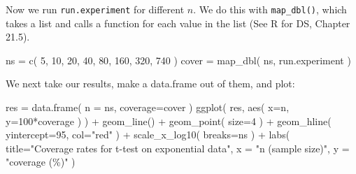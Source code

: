 \documentclass[
]{book}
\newenvironment{Shaded}{\begin{snugshade}}{\end{snugshade}}
\newcommand{\AttributeTok}[1]{\textcolor[rgb]{0.77,0.63,0.00}{#1}}
\newcommand{\ControlFlowTok}[1]{\textcolor[rgb]{0.13,0.29,0.53}{\textbf{#1}}}
\newcommand{\DecValTok}[1]{\textcolor[rgb]{0.00,0.00,0.81}{#1}}
\newcommand{\FunctionTok}[1]{\textcolor[rgb]{0.00,0.00,0.00}{#1}}
\newcommand{\NormalTok}[1]{#1}
\newcommand{\OtherTok}[1]{\textcolor[rgb]{0.56,0.35,0.01}{#1}}
\newcommand{\SpecialCharTok}[1]{\textcolor[rgb]{0.00,0.00,0.00}{#1}}
\newcommand{\StringTok}[1]{\textcolor[rgb]{0.31,0.60,0.02}{#1}}
\begin{document}
\begin{Shaded}
\end{Shaded}

Now we run \texttt{run.experiment} for different \(n\). We do this with \texttt{map\_dbl()},
which takes a list and calls a function for each value in the list (See R for
DS, Chapter 21.5).

\begin{Shaded}
\begin{Highlighting}[]
\NormalTok{ns }\OtherTok{=} \FunctionTok{c}\NormalTok{( }\DecValTok{5}\NormalTok{, }\DecValTok{10}\NormalTok{, }\DecValTok{20}\NormalTok{, }\DecValTok{40}\NormalTok{, }\DecValTok{80}\NormalTok{, }\DecValTok{160}\NormalTok{, }\DecValTok{320}\NormalTok{, }\DecValTok{740}\NormalTok{ )}
\NormalTok{cover }\OtherTok{=} \FunctionTok{map\_dbl}\NormalTok{( ns, run.experiment )}
\end{Highlighting}
\end{Shaded}

We next take our results, make a data.frame out of them, and plot:

\begin{Shaded}
\begin{Highlighting}[]
\NormalTok{res }\OtherTok{=} \FunctionTok{data.frame}\NormalTok{( }\AttributeTok{n =}\NormalTok{ ns, }\AttributeTok{coverage=}\NormalTok{cover )}
\FunctionTok{ggplot}\NormalTok{( res, }\FunctionTok{aes}\NormalTok{( }\AttributeTok{x=}\NormalTok{n, }\AttributeTok{y=}\DecValTok{100}\SpecialCharTok{*}\NormalTok{coverage ) ) }\SpecialCharTok{+}
  \FunctionTok{geom\_line}\NormalTok{() }\SpecialCharTok{+} \FunctionTok{geom\_point}\NormalTok{( }\AttributeTok{size=}\DecValTok{4}\NormalTok{ ) }\SpecialCharTok{+}
  \FunctionTok{geom\_hline}\NormalTok{( }\AttributeTok{yintercept=}\DecValTok{95}\NormalTok{, }\AttributeTok{col=}\StringTok{"red"}\NormalTok{ ) }\SpecialCharTok{+}
  \FunctionTok{scale\_x\_log10}\NormalTok{( }\AttributeTok{breaks=}\NormalTok{ns ) }\SpecialCharTok{+}
  \FunctionTok{labs}\NormalTok{( }\AttributeTok{title=}\StringTok{"Coverage rates for t{-}test on exponential data"}\NormalTok{,}
        \AttributeTok{x =} \StringTok{"n (sample size)"}\NormalTok{, }\AttributeTok{y =} \StringTok{"coverage (\%)"}\NormalTok{ )}
\end{Highlighting}
\end{Shaded}
\end{document}
